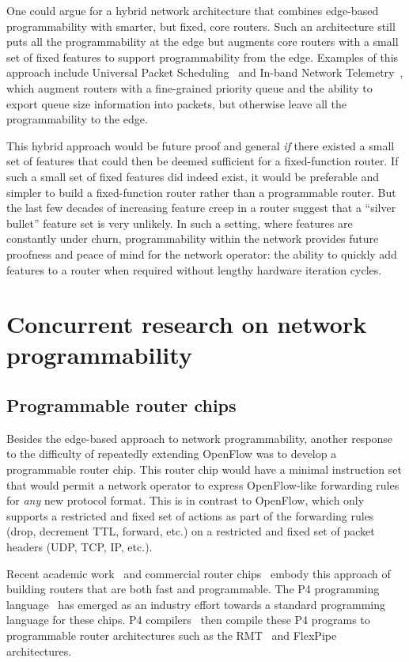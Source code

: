 One could argue for a hybrid network architecture that combines edge-based
programmability with smarter, but fixed, core routers. Such an architecture
still puts all the programmability at the edge but augments core routers with a
small set of fixed features to support programmability from the edge.  Examples
of this approach include Universal Packet Scheduling~\cite{ups} and In-band
Network Telemetry~\cite{int, int_paper}, which augment routers with a
fine-grained priority queue and the ability to export queue size information
into packets, but otherwise leave all the programmability to the edge.

This hybrid approach would be future proof and general {\em if} there existed a small
set of features that could then be deemed sufficient for a fixed-function
router. If such a small set of fixed features did indeed exist, it would be
preferable and simpler to build a fixed-function router rather than a
programmable router. But the last few decades of increasing feature creep in a
router suggest that a ``silver bullet'' feature set is very unlikely. In such a setting,
where features are constantly under churn, programmability within the network
provides future proofness and peace of mind for the network operator: the
ability to quickly add features to a router when required without lengthy
hardware iteration cycles.

\section{Concurrent research on network programmability}
\label{s:concurrent}

\subsection{Programmable router chips}
\label{ss:prog_router_chips}
Besides the edge-based approach to network programmability, another response to
the difficulty of repeatedly extending OpenFlow was to develop a programmable
router chip. This router chip would have a minimal instruction set that would
permit a network operator to express OpenFlow-like forwarding rules for {\em
any} new protocol format. This is in contrast to OpenFlow, which only supports
a restricted and fixed set of actions as part of the forwarding rules (drop,
decrement TTL, forward, etc.) on a restricted and fixed set of packet headers
(UDP, TCP, IP, etc.).

Recent academic work~\cite{rmt} and commercial router chips~\cite{tofino,
flexpipe, xpliant} embody this approach of building routers that are both fast
and programmable. The P4 programming language~\cite{p4} has emerged as an
industry effort towards a standard programming language for these chips.  P4
compilers~\cite{lavanya_compiler} then compile these P4 programs to
programmable router architectures such as the RMT~\cite{rmt} and
FlexPipe~\cite{flexpipe} architectures.

